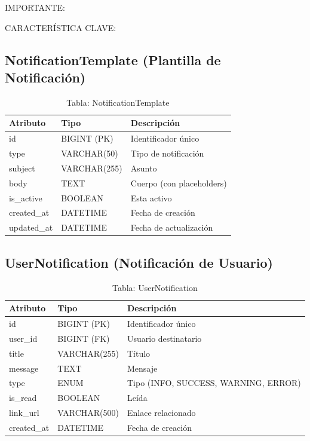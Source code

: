 \documentclass[12pt,a4paper,oneside]{book}
\begin{document}
\begin{alert}{IMPORTANTE:}
\begin{info}{CARACTERÍSTICA CLAVE:}
\subsection{NotificationTemplate (Plantilla de Notificación)}
\label{sec:notificationtemplate}

\begin{table}[ht]
    \centering
    \caption{Tabla: NotificationTemplate}
    \begin{tabular}{@{}lll@{}}
        \toprule
        \textbf{Atributo} & \textbf{Tipo} & \textbf{Descripción} \\
        \midrule
        id & BIGINT (PK) & Identificador único \\
        type & VARCHAR(50) & Tipo de notificación \\
        subject & VARCHAR(255) & Asunto \\
        body & TEXT & Cuerpo (con placeholders) \\
        is\_active & BOOLEAN & Esta activo \\
        created\_at & DATETIME & Fecha de creación \\
        updated\_at & DATETIME & Fecha de actualización \\
        \bottomrule
    \end{tabular}
\end{table}

\subsection{UserNotification (Notificación de Usuario)}
\label{sec:usernotification}

\begin{table}[ht]
    \centering
    \caption{Tabla: UserNotification}
    \begin{tabular}{@{}lll@{}}
        \toprule
        \textbf{Atributo} & \textbf{Tipo} & \textbf{Descripción} \\
        \midrule
        id & BIGINT (PK) & Identificador único \\
        user\_id & BIGINT (FK) & Usuario destinatario \\
        title & VARCHAR(255) & Título \\
        message & TEXT & Mensaje \\
        type & ENUM & Tipo (INFO, SUCCESS, WARNING, ERROR) \\
        is\_read & BOOLEAN & Leída \\
        link\_url & VARCHAR(500) & Enlace relacionado \\
        created\_at & DATETIME & Fecha de creación \\
        \bottomrule
    \end{tabular}
\end{table}


\end{info}
\end{alert}
\end{document}
